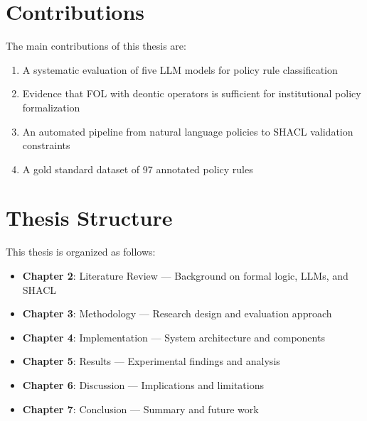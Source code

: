 \section{Contributions}

The main contributions of this thesis are:

\begin{enumerate}
    \item A systematic evaluation of five LLM models for policy rule classification
    \item Evidence that FOL with deontic operators is sufficient for institutional policy formalization
    \item An automated pipeline from natural language policies to SHACL validation constraints
    \item A gold standard dataset of 97 annotated policy rules
\end{enumerate}

\section{Thesis Structure}

This thesis is organized as follows:

\begin{itemize}
    \item \textbf{Chapter 2}: Literature Review --- Background on formal logic, LLMs, and SHACL
    \item \textbf{Chapter 3}: Methodology --- Research design and evaluation approach
    \item \textbf{Chapter 4}: Implementation --- System architecture and components
    \item \textbf{Chapter 5}: Results --- Experimental findings and analysis
    \item \textbf{Chapter 6}: Discussion --- Implications and limitations
    \item \textbf{Chapter 7}: Conclusion --- Summary and future work
\end{itemize}

